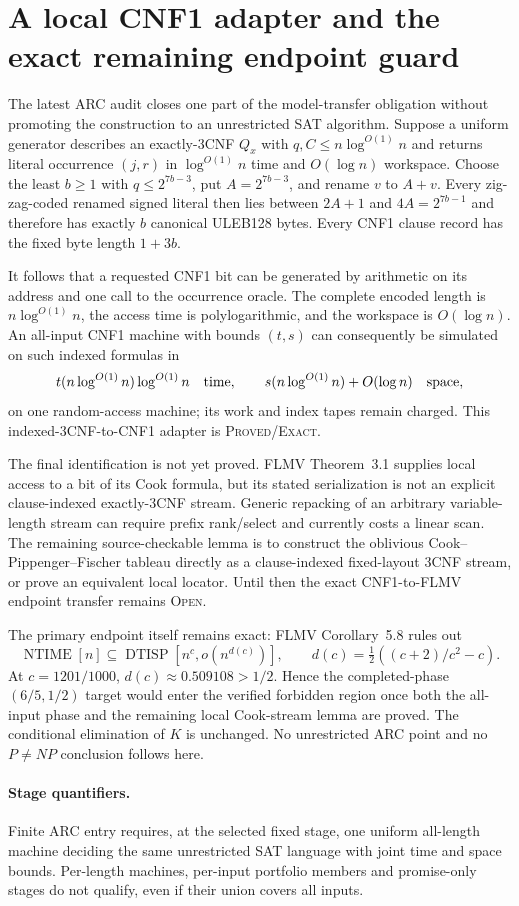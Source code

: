 \section{A local CNF1 adapter and the exact remaining endpoint guard}

The latest ARC audit closes one part of the model-transfer obligation without
promoting the construction to an unrestricted SAT algorithm.  Suppose a
uniform generator describes an exactly-3CNF $Q_x$ with
$q,C\le n\log^{O(1)}n$ and returns literal occurrence $(j,r)$ in
$\log^{O(1)}n$ time and $O(\log n)$ workspace.  Choose the least $b\ge1$
with $q\le2^{7b-3}$, put $A=2^{7b-3}$, and rename $v$ to $A+v$.
Every zig-zag-coded renamed signed literal then lies between $2A+1$ and
$4A=2^{7b-1}$ and therefore has exactly $b$ canonical ULEB128 bytes.  Every
CNF1 clause record has the fixed byte length $1+3b$.

It follows that a requested CNF1 bit can be generated by arithmetic on its
address and one call to the occurrence oracle.  The complete encoded length
is $n\log^{O(1)}n$, the access time is polylogarithmic, and the workspace is
$O(\log n)$.  An all-input CNF1 machine with bounds $(t,s)$ can consequently
be simulated on such indexed formulas in
\[
 t(n\log^{O(1)}n)\log^{O(1)}n
 \quad\hbox{time},\qquad
 s(n\log^{O(1)}n)+O(\log n)\quad\hbox{space},
\]
on one random-access machine; its work and index tapes remain charged.
This indexed-3CNF-to-CNF1 adapter is \textsc{Proved/Exact}.

The final identification is not yet proved.  FLMV Theorem~3.1 supplies local
access to a bit of its Cook formula, but its stated serialization is not an
explicit clause-indexed exactly-3CNF stream.  Generic repacking of an
arbitrary variable-length stream can require prefix rank/select and currently
costs a linear scan.  The remaining source-checkable lemma is to construct
the oblivious Cook--Pippenger--Fischer tableau directly as a clause-indexed
fixed-layout 3CNF stream, or prove an equivalent local locator.  Until then
the exact CNF1-to-FLMV endpoint transfer remains \textsc{Open}.

The primary endpoint itself remains exact: FLMV Corollary~5.8 rules out
\[
 \operatorname{NTIME}[n]\subseteq
 \operatorname{DTISP}[n^c,o(n^{d(c)})],\qquad
 d(c)=\tfrac12((c+2)/c^2-c).
\]
At $c=1201/1000$, $d(c)\approx0.509108>1/2$.  Hence the completed-phase
$(6/5,1/2)$ target would enter the verified forbidden region once both the
all-input phase and the remaining local Cook-stream lemma are proved.  The
conditional elimination of $K$ is unchanged.  No unrestricted ARC point and
no $P\ne NP$ conclusion follows here.

\paragraph{Stage quantifiers.}
Finite ARC entry requires, at the selected fixed stage, one uniform
all-length machine deciding the same unrestricted SAT language with joint
time and space bounds.  Per-length machines, per-input portfolio members and
promise-only stages do not qualify, even if their union covers all inputs.

